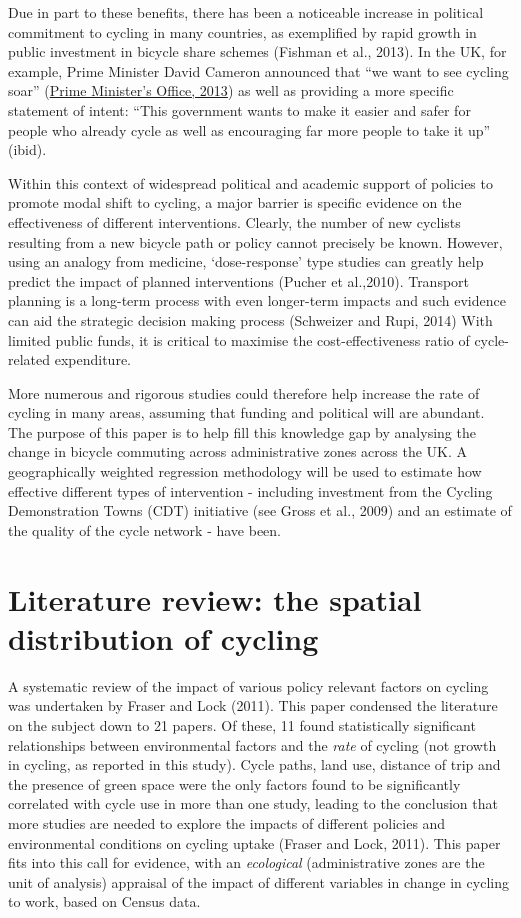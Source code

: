 Due in part to these benefits, there has been a noticeable increase in
political commitment to cycling in many countries, as exemplified by
rapid growth in public investment in bicycle share schemes (Fishman et
al., 2013). In the UK, for example, Prime Minister David Cameron
announced that ``we want to see cycling soar''
(\href{https://www.gov.uk/government/news/government-shifts-cycling-up-a-gear}{Prime
Minister's Office, 2013}) as well as providing a more specific statement
of intent: ``This government wants to make it easier and safer for
people who already cycle as well as encouraging far more people to take
it up'' (ibid).

Within this context of widespread political and academic support of
policies to promote modal shift to cycling, a major barrier is specific
evidence on the effectiveness of different interventions. Clearly, the
number of new cyclists resulting from a new bicycle path or policy
cannot precisely be known. However, using an analogy from medicine,
`dose-response' type studies can greatly help predict the impact of
planned interventions (Pucher et al.,2010). Transport planning is a
long-term process with even longer-term impacts and such evidence can
aid the strategic decision making process (Schweizer and Rupi, 2014)
With limited public funds, it is critical to maximise the
cost-effectiveness ratio of cycle-related expenditure.

More numerous and rigorous studies could therefore help increase the
rate of cycling in many areas, assuming that funding and political will
are abundant. The purpose of this paper is to help fill this knowledge
gap by analysing the change in bicycle commuting across administrative
zones across the UK. A geographically weighted regression methodology
will be used to estimate how effective different types of intervention -
including investment from the Cycling Demonstration Towns (CDT)
initiative (see Gross et al., 2009) and an estimate of the quality of
the cycle network - have been.

\section{Literature review: the spatial distribution of
cycling}\label{literature-review-the-spatial-distribution-of-cycling}

A systematic review of the impact of various policy relevant factors on
cycling was undertaken by Fraser and Lock (2011). This paper condensed
the literature on the subject down to 21 papers. Of these, 11 found
statistically significant relationships between environmental factors
and the \emph{rate} of cycling (not growth in cycling, as reported in
this study). Cycle paths, land use, distance of trip and the presence of
green space were the only factors found to be significantly correlated
with cycle use in more than one study, leading to the conclusion that
more studies are needed to explore the impacts of different policies and
environmental conditions on cycling uptake (Fraser and Lock, 2011). This
paper fits into this call for evidence, with an \emph{ecological}
(administrative zones are the unit of analysis) appraisal of the impact
of different variables in change in cycling to work, based on Census
data.

